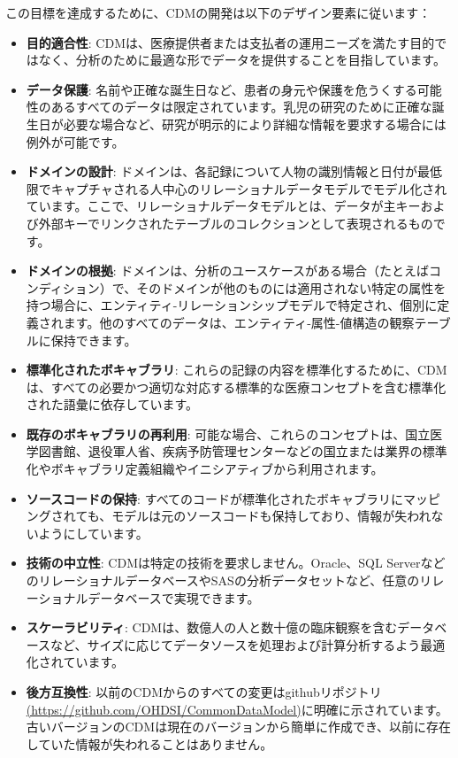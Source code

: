 \documentclass[
  11pt]{book}
\providecommand{\tightlist}{%
  \setlength{\itemsep}{0pt}\setlength{\parskip}{0pt}}
\theoremstyle{definition}
\theoremstyle{definition}
\theoremstyle{definition}
\theoremstyle{definition}
\theoremstyle{remark}
\begin{document}
この目標を達成するために、CDMの開発は以下のデザイン要素に従います：

\begin{itemize}
\tightlist
\item
  \textbf{目的適合性}: CDMは、医療提供者または支払者の運用ニーズを満たす目的ではなく、分析のために最適な形でデータを提供することを目指しています。 
\item
  \textbf{データ保護}: 名前や正確な誕生日など、患者の身元や保護を危うくする可能性のあるすべてのデータは限定されています。乳児の研究のために正確な誕生日が必要な場合など、研究が明示的により詳細な情報を要求する場合には例外が可能です。 
\item
  \textbf{ドメインの設計}: ドメインは、各記録について人物の識別情報と日付が最低限でキャプチャされる人中心のリレーショナルデータモデルでモデル化されています。ここで、リレーショナルデータモデルとは、データが主キーおよび外部キーでリンクされたテーブルのコレクションとして表現されるものです。
\item
  \textbf{ドメインの根拠}: ドメインは、分析のユースケースがある場合（たとえばコンディション）で、そのドメインが他のものには適用されない特定の属性を持つ場合に、エンティティ-リレーションシップモデルで特定され、個別に定義されます。他のすべてのデータは、エンティティ-属性-値構造の観察テーブルに保持できます。 
\item
  \textbf{標準化されたボキャブラリ}: これらの記録の内容を標準化するために、CDMは、すべての必要かつ適切な対応する標準的な医療コンセプトを含む標準化された語彙に依存しています。
\item
  \textbf{既存のボキャブラリの再利用}: 可能な場合、これらのコンセプトは、国立医学図書館、退役軍人省、疾病予防管理センターなどの国立または業界の標準化やボキャブラリ定義組織やイニシアティブから利用されます。
\item
  \textbf{ソースコードの保持}: すべてのコードが標準化されたボキャブラリにマッピングされても、モデルは元のソースコードも保持しており、情報が失われないようにしています。  
\item
  \textbf{技術の中立性}: CDMは特定の技術を要求しません。Oracle、SQL ServerなどのリレーショナルデータベースやSASの分析データセットなど、任意のリレーショナルデータベースで実現できます。 
\item
  \textbf{スケーラビリティ}: CDMは、数億人の人と数十億の臨床観察を含むデータベースなど、サイズに応じてデータソースを処理および計算分析するよう最適化されています。 
\item
  \textbf{後方互換性}: 以前のCDMからのすべての変更はgithubリポジトリ\href{https://github.com/OHDSI/CommonDataModel}{(https://github.com/OHDSI/CommonDataModel)}に明確に示されています。古いバージョンのCDMは現在のバージョンから簡単に作成でき、以前に存在していた情報が失われることはありません。 
\end{itemize}
\end{document}
